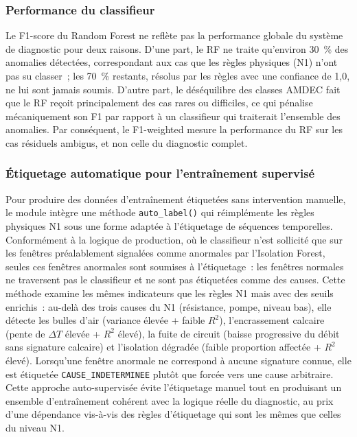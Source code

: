\subsubsection{Performance du classifieur}

Le F1-score du Random Forest ne reflète pas la performance globale du système de diagnostic pour deux raisons. D'une part, le RF ne traite qu'environ 30~\% des anomalies détectées, correspondant aux cas que les règles physiques (N1) n'ont pas su classer~; les 70~\% restants, résolus par les règles avec une confiance de 1,0, ne lui sont jamais soumis. D'autre part, le déséquilibre des classes AMDEC fait que le RF reçoit principalement des cas rares ou difficiles, ce qui pénalise mécaniquement son F1 par rapport à un classifieur qui traiterait l'ensemble des anomalies. Par conséquent, le F1-weighted mesure la performance du RF sur les cas résiduels ambigus, et non celle du diagnostic complet.

\subsubsection{Étiquetage automatique pour l'entraînement supervisé}

Pour produire des données d'entraînement étiquetées sans intervention manuelle, le module intègre une méthode \texttt{auto\_label()} qui réimplémente les règles physiques N1 sous une forme adaptée à l'étiquetage de séquences temporelles. Conformément à la logique de production, où le classifieur n'est sollicité que sur les fenêtres préalablement signalées comme anormales par l'Isolation Forest, seules ces fenêtres anormales sont soumises à l'étiquetage~: les fenêtres normales ne traversent pas le classifieur et ne sont pas étiquetées comme des causes. Cette méthode examine les mêmes indicateurs que les règles N1 mais avec des seuils enrichis~: au-delà des trois causes du N1 (résistance, pompe, niveau bas), elle détecte les bulles d'air (variance élevée + faible \(R^2\)), l'encrassement calcaire (pente de \(\Delta T\) élevée + \(R^2\) élevé), la fuite de circuit (baisse progressive du débit sans signature calcaire) et l'isolation dégradée (faible proportion affectée + \(R^2\) élevé). Lorsqu'une fenêtre anormale ne correspond à aucune signature connue, elle est étiquetée \texttt{CAUSE\_INDETERMINEE} plutôt que forcée vers une cause arbitraire. Cette approche auto-supervisée évite l'étiquetage manuel tout en produisant un ensemble d'entraînement cohérent avec la logique réelle du diagnostic, au prix d'une dépendance vis-à-vis des règles d'étiquetage qui sont les mêmes que celles du niveau N1.

